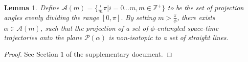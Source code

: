 \documentclass[conference]{IEEEtran}
\newtheorem{defn}[thm]{Definition}
\newtheorem{lem}[thm]{Lemma}
\newcommand*{\myset}[1]{\mathcal{#1}} %
\newcommand*{\sptime}{\xi} %
\newcommand*{\projang}{\alpha} %
\newcommand*{\projplane}{\myset{P}} %
\newcommand*{\entangle}{\gamma} %
\newcommand*{\entangledef}{\phi} %
\newcommand*{\angleset}{\myset{A}} %
\newcommand*{\numsample}{m} %
\newcommand*{\angleA}{\beta}
\newcommand*{\openinterval}{\myset{D}}
\newcommand*{\positiveinteger}{\mathbb{Z}^+}
\begin{document}
\begin{lem}\label{lm:straightline}
    Define $\angleset(\numsample)=\{\frac{i}{\numsample}\pi|i=0\dots m,m\in\positiveinteger\}$ to be the set of projection angles evenly dividing the range $[0, \pi]$.
    By setting $\numsample>\frac{\pi}{\entangledef}$, there exists $\alpha\in\angleset(\numsample)$, such that the projection of a set of $\entangledef$-entangled space-time trajectories onto the plane $\projplane(\projang)$ is non-isotopic to a set of straight lines.
\end{lem}
\begin{proof}
    See Section 1 of the supplementary document.
\end{proof}
    
\end{document}
